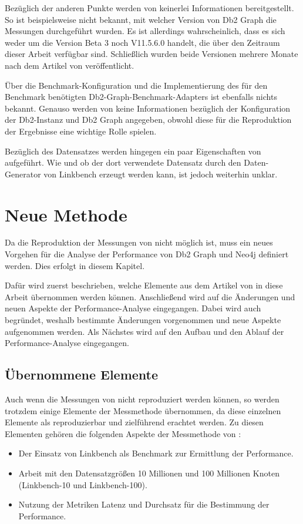 Bezüglich der anderen Punkte werden von  keinerlei Informationen bereitgestellt. So ist beispielsweise nicht bekannt, mit welcher Version von Db2 Graph die Messungen durchgeführt wurden. Es ist allerdings wahrscheinlich, dass es sich weder um die Version Beta 3 noch V11.5.6.0 handelt, die über den Zeitraum dieser Arbeit verfügbar sind. Schließlich wurden beide Versionen mehrere Monate nach dem Artikel von  veröffentlicht. 

Über die Benchmark-Konfiguration und die Implementierung des für den Benchmark benötigten Db2-Graph-Benchmark-Adapters ist ebenfalls nichts bekannt. Genauso werden von  keine Informationen bezüglich der Konfiguration der Db2-Instanz und Db2 Graph angegeben, obwohl diese für die Reproduktion der Ergebnisse eine wichtige Rolle spielen. 

Bezüglich des Datensatzes werden hingegen ein paar Eigenschaften von  aufgeführt. Wie und ob der dort verwendete Datensatz durch den Daten-Generator von Linkbench erzeugt werden kann, ist jedoch weiterhin unklar.

\section{Neue Methode}
Da die Reproduktion der Messungen von  nicht möglich ist, muss ein neues Vorgehen für die Analyse der Performance von Db2 Graph und Neo4j definiert werden. Dies erfolgt in diesem Kapitel. 

Dafür wird zuerst beschrieben, welche Elemente aus dem Artikel von  in diese Arbeit übernommen werden können. Anschließend wird auf die Änderungen und neuen Aspekte der Performance-Analyse eingegangen. Dabei wird auch begründet, weshalb bestimmte Änderungen vorgenommen und neue Aspekte aufgenommen werden. Als Nächstes wird auf den Aufbau und den Ablauf der Performance-Analyse eingegangen. 

\subsection{Übernommene Elemente}
Auch wenn die Messungen von  nicht reproduziert werden können, so werden trotzdem einige Elemente der Messmethode übernommen, da diese einzelnen Elemente als reproduzierbar und zielführend erachtet werden. Zu diesen Elementen gehören die folgenden Aspekte der Messmethode von :
\begin{itemize}
    \item Der Einsatz von Linkbench als Benchmark zur Ermittlung der Performance.
    \item Arbeit mit den Datensatzgrößen 10 Millionen und 100 Millionen Knoten (Linkbench-10 und Linkbench-100).
    \item Nutzung der Metriken Latenz und Durchsatz für die Bestimmung der Performance.  
\end{itemize}


